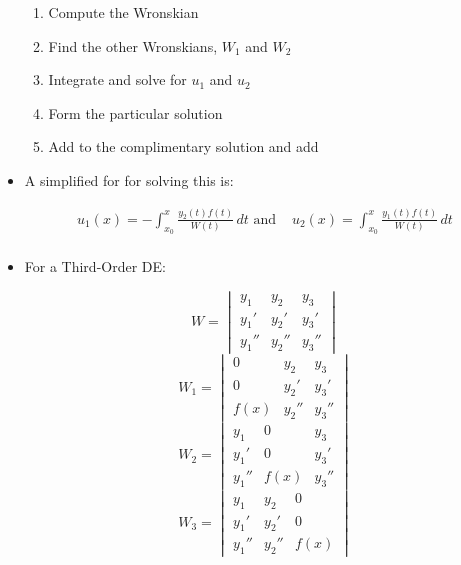 \documentclass[12pt]{article}
\begin{document}
\begin{itemize}
\begin{enumerate}
      \item Compute the Wronskian

      \item Find the other Wronskians, $W_1$ and $W_2$

      \item Integrate and solve for $u_1$ and $u_2$

      \item Form the particular solution

      \item Add to the complimentary solution and add

    \end{enumerate}

  \item A simplified for for solving this is:

    \begin{equation}
      \begin{split}
        u_1(x) =-\int_{x_0}^x \frac{y_2(t)f(t)}{W(t)}\,dt \text{ and } & u_2(x)=\int_{x_0}^{x} \frac{y_1(t)f(t)}{W(t)}\,dt\\
      \end{split}
      \label{3}
    \end{equation}

  \item For a Third-Order DE:

    $$W=\begin{vmatrix} y_1 & y_2 & y_3 \\ y_1' & y_2' & y_3' \\ y_1'' & y_2'' & y_3'' \end{vmatrix}$$
    $$W_1=\begin{vmatrix} 0 & y_2 & y_3 \\ 0 & y_2' & y_3' \\ f(x) & y_2'' & y_3'' \end{vmatrix}$$
    $$W_2=\begin{vmatrix} y_1 & 0 & y_3 \\ y_1' & 0 & y_3' \\ y_1'' & f(x) & y_3'' \end{vmatrix}$$
    $$W_3=\begin{vmatrix} y_1 & y_2 & 0 \\ y_1' & y_2' & 0 \\ y_1'' & y_2'' & f(x) \end{vmatrix}$$

\end{itemize}
\end{document}
